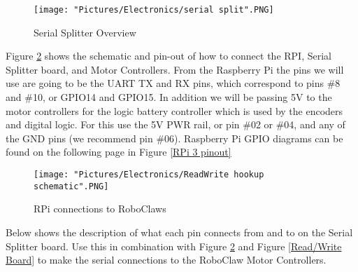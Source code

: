 \documentclass[12pt]{article}
\begin{document}
\begin{figure}[H]
  	\centering
    	\texttt{[image: "Pictures/Electronics/serial split".PNG]}
 	\caption{Serial Splitter Overview}
	\label{ss}
\end{figure}




Figure \ref{rpi to rc} shows the schematic and pin-out of how to connect the RPI, Serial Splitter board, and Motor Controllers. From the Raspberry Pi the pins we will use are going to be the UART TX and RX pins, which correspond to pins \#8 and \#10, or GPIO14 and GPIO15. In addition we will be passing 5V to the motor controllers for the logic battery controller which is used by the encoders and digital logic. For this use the 5V PWR rail, or pin  \#02 or \#04, and any of the GND pins (we recommend pin \#06). Raspberry Pi GPIO diagrams can be found on the following page in Figure \ref{RPi 3 pinout}

\begin{figure}[H]
 	\centering
	\texttt{[image: "Pictures/Electronics/ReadWrite hookup schematic".PNG]}
 	\caption{RPi connections to RoboClaws}
	\label{rpi to rc}
\end{figure}


Below shows the description of what each pin connects from and to on the Serial Splitter board. Use this in combination with Figure \ref{rpi to rc} and Figure \ref{Read/Write Board} to make the serial connections to the RoboClaw Motor Controllers. 

\bigskip
\end{document}
